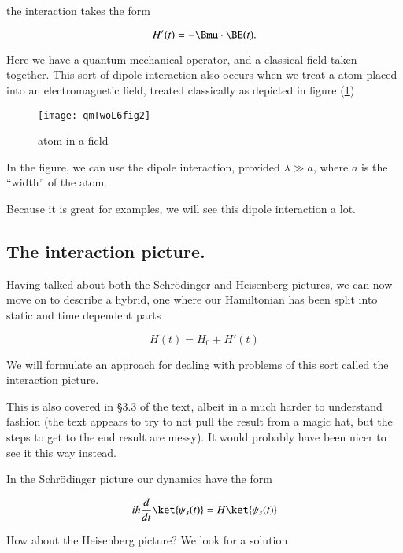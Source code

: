 the interaction takes the form

\begin{equation}\label{eqn:qmTwoL6:90}
H'(t) = -\Bmu \cdot \BE(t).
\end{equation}

Here we have a quantum mechanical operator, and a classical field taken together.  This sort of dipole interaction also occurs when we treat a atom placed into an electromagnetic field, treated classically as depicted in figure (\ref{fig:qmTwoL6:2})

\begin{figure}[htp]
\centering
\texttt{[image: qmTwoL6fig2]}
\caption{atom in a field}\label{fig:qmTwoL6:2}
\end{figure}

In the figure, we can use the dipole interaction, provided $\lambda \gg a$, where $a$ is the ``width'' of the atom.

Because it is great for examples, we will see this dipole interaction a lot.

\subsection{The interaction picture.}

Having talked about both the Schr\"{o}dinger and Heisenberg pictures, we can now move on to describe a hybrid, one where our Hamiltonian has been split into static and time dependent parts

\begin{equation}\label{eqn:qmTwoL6:110}
H(t) = H_0 + H'(t)
\end{equation}

We will formulate an approach for dealing with problems of this sort called the interaction picture.

This is also covered in \S 3.3 of the text, albeit in a much harder to understand fashion (the text appears to try to not pull the result from a magic hat, but the steps to get to the end result are messy).  It would probably have been nicer to see it this way instead.

In the Schr\"{o}dinger picture our dynamics have the form

\begin{equation}\label{eqn:qmTwoL6:130}
i \hbar \frac{d}{dt} \ket{\psi_s(t)} = H \ket{\psi_s(t)}
\end{equation}

How about the Heisenberg picture?  We look for a solution 

